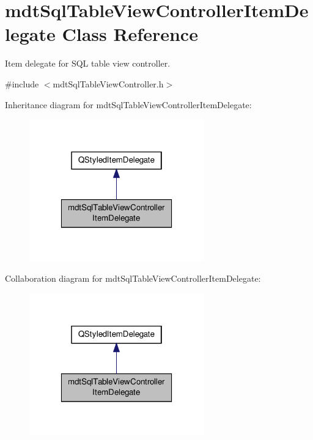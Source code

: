 \hypertarget{classmdt_sql_table_view_controller_item_delegate}{\section{mdt\-Sql\-Table\-View\-Controller\-Item\-Delegate Class Reference}
\label{classmdt_sql_table_view_controller_item_delegate}
}


Item delegate for S\-Q\-L table view controller.  




{\ttfamily \#include $<$mdt\-Sql\-Table\-View\-Controller.\-h$>$}



Inheritance diagram for mdt\-Sql\-Table\-View\-Controller\-Item\-Delegate\-:\nopagebreak
\begin{figure}[H]
\begin{center}
\leavevmode
\includegraphics[width=214pt]{classmdt_sql_table_view_controller_item_delegate__inherit__graph}
\end{center}
\end{figure}


Collaboration diagram for mdt\-Sql\-Table\-View\-Controller\-Item\-Delegate\-:\nopagebreak
\begin{figure}[H]
\begin{center}
\leavevmode
\includegraphics[width=214pt]{classmdt_sql_table_view_controller_item_delegate__coll__graph}
\end{center}
\end{figure}
